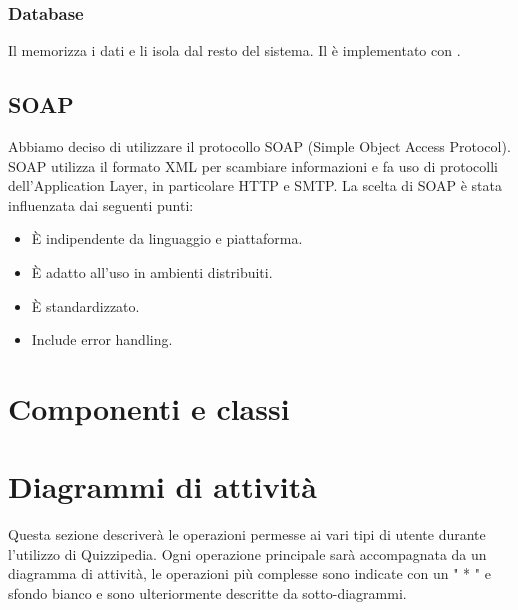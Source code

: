 \documentclass[a4paper, titlepage]{article}
\begin{document}
	\subsubsection{Database}
	Il  memorizza i dati e li isola dal resto del sistema. Il  è implementato con . 
	
	\subsection{SOAP}
	Abbiamo deciso di utilizzare il protocollo SOAP (Simple Object Access Protocol).
	SOAP utilizza il formato XML per scambiare informazioni e fa uso di protocolli dell'Application Layer, in particolare HTTP e SMTP. La scelta di SOAP è stata influenzata dai seguenti punti:
	
	\begin{itemize}
		\item È indipendente da linguaggio e piattaforma.
		\item È adatto all'uso in ambienti distribuiti.
		\item È standardizzato.
		\item Include ­error handling.
	\end{itemize}
	
\newpage

\section{Componenti e classi}


\newpage
\section{Diagrammi di attività}
Questa sezione descriverà le operazioni permesse ai vari tipi di utente durante l’utilizzo di Quizzipedia. Ogni operazione principale sarà accompagnata da un diagramma di attività, le operazioni più complesse sono indicate con un " * " e sfondo bianco e sono ulteriormente descritte da sotto-diagrammi.
\end{document}
